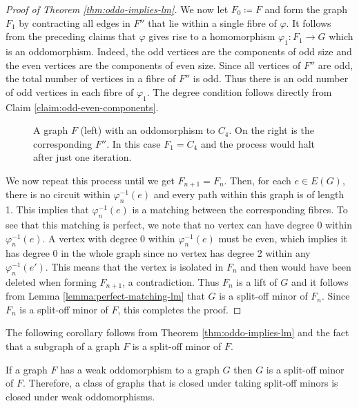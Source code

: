 \documentclass[11pt]{article}
\begin{document}
\begin{proof}[Proof of Theorem \ref{thm:oddo-implies-lm}]
    We now let $F_0 \coloneqq F$ and form the graph $F_1$ by contracting all edges in $F''$ that lie within a single fibre of $\varphi$.
    It follows from the preceding claims that $\varphi$ gives rise to a homomorphism $\varphi_1: F_1 \to G$ which is an oddomorphism.
    Indeed, the odd vertices are the components of odd size and the even vertices are the components of even size. Since all vertices of $F''$ are odd, the total number of vertices in a fibre of $F''$ is odd. Thus there is an odd number of odd vertices in each fibre of $\varphi_1$. The degree condition follows directly from Claim \ref{claim:odd-even-components}. 
    \par 

    \begin{figure}[htbp]
        \centering
        
        \caption{A graph $F$ (left) with an oddomorphism to $C_4$. On the right is the corresponding $F''$. In this case $F_1 = C_4$ and the process would halt after just one iteration.}
        \label{fig:oddo-split-minor-example}
    \end{figure}
    
    We now repeat this process until we get $F_{n+1} = F_n$. Then, for each $e \in E(G)$, there is no circuit within $\varphi_n^{-1}(e)$ and every path within this graph is of length 1. This implies that $\varphi_n^{-1}(e)$ is a matching between the corresponding fibres.
    To see that this matching is perfect, we note that no vertex can have degree 0 within $\varphi_n^{-1}(e)$. A vertex with degree 0 within $\varphi_n^{-1}(e)$ must be even, which implies it has degree 0 in the whole graph since no vertex has degree 2 within any $\varphi_n^{-1}(e')$. This means that the vertex is isolated in $F_n$ and then would have been deleted when forming $F_{n+1}$, a contradiction.
    Thus $F_n$ is a lift of $G$ and it follows from Lemma \ref{lemma:perfect-matching-lm} that $G$ is a split-off minor of $F_n$. Since $F_n$ is a split-off minor of $F$, this completes the proof.
\end{proof}


The following corollary follows from Theorem \ref{thm:oddo-implies-lm} and the fact that a subgraph of a graph $F$ is a split-off minor of $F$.
\begin{corollary}
    \label{cor:wo-implies-som}
    If a graph $F$ has a weak oddomorphism to a graph $G$ then $G$ is a split-off minor of $F$.
    Therefore, a class of graphs that is closed under taking split-off minors is closed under weak oddomorphisms.
\end{corollary}
\end{document}
